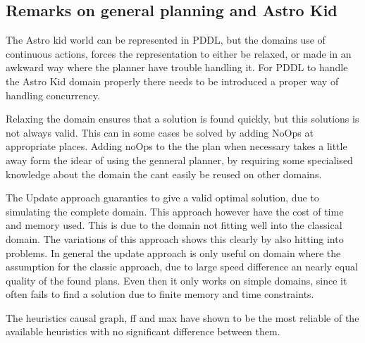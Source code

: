 \subsection{Remarks on general planning and Astro Kid}
	The Astro kid world can be represented in PDDL, but the domains use of continuous actions, forces the representation to either be relaxed, or made in an awkward way where the planner have trouble handling it. For PDDL to handle the Astro Kid domain properly there needs to be introduced a proper way of handling concurrency.

	Relaxing the domain ensures that a solution is found quickly, but this solutions is not always valid. This can in some cases be solved by adding NoOps at appropriate places. Adding noOps to the the plan when necessary takes a little away form the idear of using the genneral planner, by requiring some specialised knowledge about the domain the cant easily be reused on other domains.
	
	The Update approach guaranties to give a valid optimal solution, due to simulating the complete domain. This approach however have the cost of time and memory used. This is due to the domain not fitting well into the classical domain. The variations of this approach shows this clearly by also hitting into problems. In general the update approach is only useful on domain where the assumption for the classic approach, due to large speed difference an nearly equal quality of the found plans. Even then it only works on simple domains, since it often fails to find a solution due to finite memory and time constraints.
	
	The heuristics causal graph, ff and max have shown to be the most reliable of the available heuristics with no significant difference between them.
	
